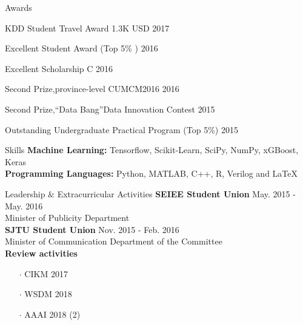 \documentclass{resume} %
\begin{document}

\begin{rSection}{Awards}
\begin{rSubsection}{}{}{}{}
\item KDD Student Travel Award \hfill{1.3K USD 2017}
\item Excellent Student Award (Top 5\% )  \hfill{2016}
\item Excellent Scholarship C \hfill{2016}
\item Second Prize,province-level CUMCM2016 \hfill{2016}
\item Second Prize,``Data Bang''Data Innovation Contest \hfill{2015} 
\item Outstanding Undergraduate Practical Program (Top 5\%) \hfill{2015}
\end{rSubsection}
\end{rSection}

\begin{rSection}{Skills}
{\bf Machine Learning: }
\hspace*{3.0 cm} Tensorflow, Scikit-Learn, SciPy, NumPy, xGBoost, Keras\\
{\bf Programming Languages: }
\hspace*{1.8 cm} Python, MATLAB, C++, R, Verilog and \LaTeX  \\
\end{rSection}
\begin{rSection}{Leadership $\&$ Extracurricular Activities}
\textbf{SEIEE Student Union} \hfill{May. 2015 - May. 2016}\\
Minister of Publicity Department  \\
\textbf{SJTU Student Union} \hfill{Nov. 2015 - Feb. 2016}\\
Minister of Communication Department of the Committee \\
\textbf{Review activities}
\begin{itemize}
	\setlength\itemsep{-4.5 pt}
	\vspace{-4.5pt}
	\item [$\cdot$] CIKM 2017
	\item [$\cdot$] WSDM 2018	
	\item [$\cdot$] AAAI 2018 (2)
\end{itemize}
\end{rSection}
\clearpage
\end{document}
